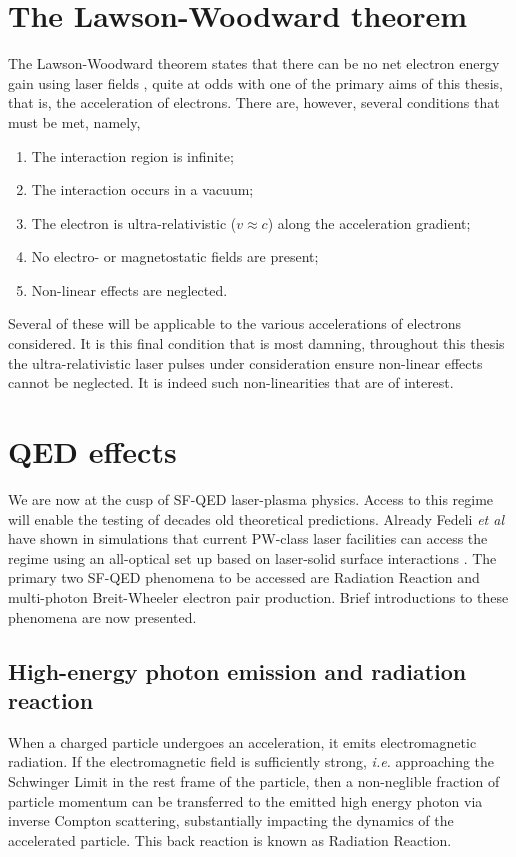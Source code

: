 \section{The Lawson-Woodward theorem}\label{sec:intro-lawson_woodward}
The Lawson-Woodward theorem states that there can be no net electron energy gain using laser fields \cite{esarey_2009_PhysicsLaserdrivenPlasmabaseda}, quite at odds with one of the primary aims of this thesis, that is, the acceleration of electrons. There are, however, several conditions that must be met, namely,
\begin{enumerate}
	\item The interaction region is infinite;
	\item The interaction  occurs in a vacuum;
	\item The electron is ultra-relativistic ($v\approx c$) along the acceleration gradient;
	\item No electro- or magnetostatic fields are present;
	\item Non-linear effects are neglected.
\end{enumerate}
Several of these will be applicable to the various accelerations of electrons considered. It is this final condition that is most damning, throughout this thesis the ultra-relativistic laser pulses under consideration ensure non-linear effects cannot be neglected. It is indeed such non-linearities that are of interest.



\section{QED effects}
We are now at the cusp of \ac{SF-QED} laser-plasma physics. Access to this regime will enable the testing of decades old theoretical predictions. Already Fedeli \textit{et al} have shown in simulations that current PW-class laser facilities can access the regime using an all-optical set up based on laser-solid surface interactions \cite{fedeli_2020_ProbingStrongfieldQED}. The primary two SF-QED phenomena to be accessed are Radiation Reaction and multi-photon Breit-Wheeler electron pair production. Brief introductions to these phenomena are now presented.


\subsection{High-energy photon emission and radiation reaction}
When a charged particle undergoes an acceleration, it emits electromagnetic radiation. If the electromagnetic field is sufficiently strong, \textit{i.e.} approaching the Schwinger Limit in the rest frame of the particle, then a non-neglible fraction of particle momentum can be transferred to the emitted high energy photon via inverse Compton scattering, substantially impacting the dynamics of the accelerated particle. This back reaction is known as Radiation Reaction.



